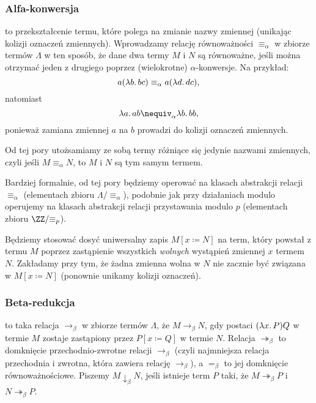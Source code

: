 \documentclass[polish,pretty]{angav}
\newcommand{\toto}{\twoheadrightarrow}
\begin{document}
\subsubsection*{Alfa-konwersja}

 to przekształcenie termu, które polega na zmianie nazwy zmiennej (unikając kolizji oznaczeń zmiennych). Wprowadzamy relację równoważności $\equiv_\alpha$ w zbiorze termów $\Lambda$ w ten sposób, że dane dwa termy $M$ i $N$ są równoważne, jeśli można otrzymać jeden z drugiego poprzez (wielokrotne) $\alpha$-konwersje. Na przykład:
\[ a (\lambda b\ldotp bc) \equiv_\alpha a (\lambda d\ldotp dc), \]
natomiast
\[ \lambda a\ldotp ab \nequiv_\alpha \lambda b\ldotp bb, \]
ponieważ zamiana zmiennej $a$ na $b$ prowadzi do kolizji oznaczeń zmiennych.

Od tej pory utożsamiamy ze sobą termy różniące się jedynie nazwami zmiennych, czyli jeśli $M \equiv_\alpha N$, to $M$ i $N$ są tym samym termem.

\begin{remark}
    Bardziej formalnie, od tej pory będziemy operować na klasach abstrakcji relacji $\equiv_\alpha$ (elementach zbioru $\Lambda/{\equiv_\alpha}$), podobnie jak przy działaniach modulo operujemy na klasach abstrakcji relacji przystawania modulo $p$ (elementach zbioru $\ZZ/{\equiv_p}$).
\end{remark}

Będziemy stosować dosyć uniwersalny zapis $M[x \coloneqq N]$ na term, który powstał z termu $M$ poprzez zastąpienie wszystkich \emph{wolnych} wystąpień zmiennej $x$ termem $N$.
Zakładamy przy tym, że żadna zmienna wolna w $N$ nie zacznie być związana w $M[x \coloneqq N]$ (ponownie unikamy kolizji oznaczeń).

\subsubsection*{Beta-redukcja}

 to taka relacja $\to_\beta$ w zbiorze termów $\Lambda$, że $M \to_\beta N$, gdy  postaci $(\lambda x\ldotp P)Q$ w termie $M$ zostaje zastąpiony przez $P[x \coloneqq Q]$ w termie $N$.
Relacja $\toto_\beta$ to domknięcie przechodnio-zwrotne relacji $\to_\beta$ (czyli najmniejsza relacja przechodnia i zwrotna, która zawiera relację $\to_\beta$), a $=_\beta$ to jej domknięcie równoważnościowe.
Piszemy $M \downarrow_\beta N$, jeśli istnieje term $P$ taki, że $M \toto_\beta P$ i $N \toto_\beta P$.
\end{document}
